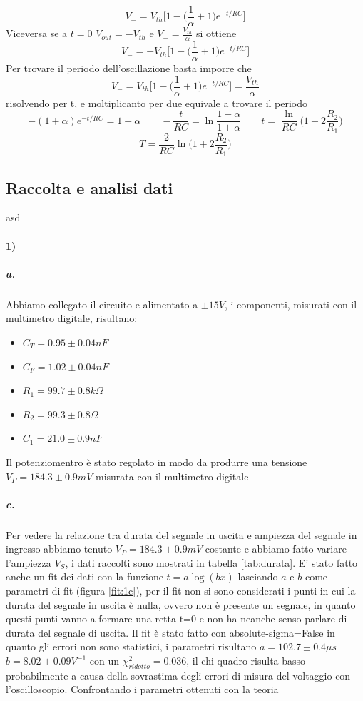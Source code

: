 \documentclass{article}
\begin{document}
			\[
				V_-=V_{th}\bigg[1-\bigg(\frac{1}{\alpha}+1\bigg)e^{-t/RC}\bigg]
			\]
			Viceversa se a $t=0$ $V_{out}=-V_{th}$ e $V_-=\frac{V_{th}}{\alpha}$ si ottiene
			\[
				V_-=-V_{th}\bigg[1-\bigg(\frac{1}{\alpha}+1\bigg)e^{-t/RC}\bigg]
			\]
			Per trovare il periodo dell'oscillazione basta imporre che 
			\[
				V_-=V_{th}\bigg[1-\bigg(\frac{1}{\alpha}+1\bigg)e^{-t/RC}\bigg]=\frac{V_{th}}{\alpha}
			\]
			risolvendo per t, e moltiplicanto per due equivale a trovare il periodo
			\[
				-(1+\alpha)e^{-t/RC}=1-\alpha\qquad -\frac{t}{RC}=\ln\frac{1-\alpha}{1+\alpha}\qquad t=\frac{\ln}{RC}\bigg(1+2\frac{R_2}{R_1} \bigg)
			\]
			\begin{equation}
				T=\frac{2}{RC}\ln\bigg(1+2\frac{R_2}{R_1} \bigg)
			\end{equation}
		\subsection{Raccolta e analisi dati}
		asd
		
		\paragraph{1)}
		\subparagraph{a.}
		Abbiamo collegato il circuito e alimentato a $\pm 15V$, i componenti, misurati con il multimetro digitale, risultano:
		\begin{itemize}
			\item $C_T=0.95\pm0.04 nF$
			\item $C_F=1.02\pm0.04 nF$
			\item $R_1=99.7\pm0.8 k\Omega$
			\item $R_2=99.3\pm0.8 \Omega$
			\item $C_1=21.0\pm0.9 nF$
		\end{itemize}
		Il potenziomentro è stato regolato in modo da produrre una tensione $V_P=184.3\pm0.9 mV$ misurata con il multimetro digitale
		
		\subparagraph{c.}
		Per vedere la relazione tra durata del segnale in uscita e ampiezza del segnale in ingresso abbiamo tenuto $V_P=184.3\pm0.9 mV$ costante e abbiamo fatto variare l'ampiezza $V_S$, i dati raccolti sono mostrati in tabella \ref{tab:durata}. E' stato fatto anche un fit dei dati con la funzione $t=a \log(bx)$ lasciando $a$ e $b$ come parametri di fit (figura \ref{fit:1c}), per il fit non si sono considerati i punti in cui la durata del segnale in uscita è nulla, ovvero non è presente un segnale, in quanto questi punti vanno a formare una retta t=0 e non ha neanche senso parlare di durata del segnale di uscita. Il fit  è stato fatto con absolute-sigma=False in quanto gli errori non sono statistici, i parametri risultano $a=102.7\pm0.4 \mu s$ $b=8.02\pm0.09 V^{-1}$ con un $\chi^2_{ridotto}=0.036$, il chi quadro risulta basso probabilmente a causa della sovrastima degli errori di misura del voltaggio con l'oscilloscopio. Confrontando i parametri ottenuti con la teoria 
		
\end{document}
